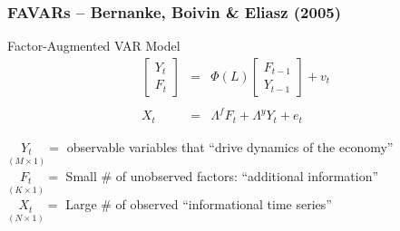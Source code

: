 \documentclass[handout]{beamer}
\begin{document}
\begin{frame}[c]\frametitle{FAVARs -- Bernanke, Boivin \& Eliasz (2005)}

\begin{block}{Factor-Augmented VAR Model}
	\begin{eqnarray*}
		\left[\begin{array}
			{c} Y_t \\ F_t
		\end{array} \right] &=& \Phi(L)\left[\begin{array}
			{c} F_{t-1} \\ Y_{t-1}
		\end{array} \right] + v_t\\ \\
		X_t &=& \Lambda^f F_t + \Lambda^y Y_t + e_t
	\end{eqnarray*}

\vspace{2em}

\small
$\underset{(M\times 1)}{Y_t} = $  observable variables that ``drive dynamics of the economy''\\ \vspace{1em}
$\underset{(K\times 1)}{F_t} = $ Small \# of unobserved factors: ``additional information''\\ \vspace{1em}
$\underset{(N\times 1)}{X_t} = $ Large \# of observed ``informational time series''
\end{block}

\end{frame}
\end{document}
